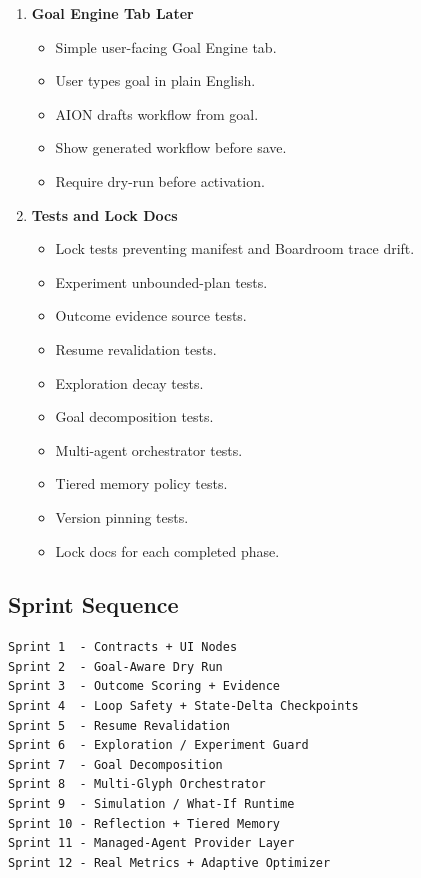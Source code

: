 \begin{enumerate}
  \item \textbf{Goal Engine Tab Later}
  \begin{itemize}
    \item Simple user-facing Goal Engine tab.
    \item User types goal in plain English.
    \item AION drafts workflow from goal.
    \item Show generated workflow before save.
    \item Require dry-run before activation.
  \end{itemize}

  \item \textbf{Tests and Lock Docs}
  \begin{itemize}
    \item Lock tests preventing manifest and Boardroom trace drift.
    \item Experiment unbounded-plan tests.
    \item Outcome evidence source tests.
    \item Resume revalidation tests.
    \item Exploration decay tests.
    \item Goal decomposition tests.
    \item Multi-agent orchestrator tests.
    \item Tiered memory policy tests.
    \item Version pinning tests.
    \item Lock docs for each completed phase.
  \end{itemize}
\end{enumerate}

\subsection{Sprint Sequence}

\begin{verbatim}
Sprint 1  - Contracts + UI Nodes
Sprint 2  - Goal-Aware Dry Run
Sprint 3  - Outcome Scoring + Evidence
Sprint 4  - Loop Safety + State-Delta Checkpoints
Sprint 5  - Resume Revalidation
Sprint 6  - Exploration / Experiment Guard
Sprint 7  - Goal Decomposition
Sprint 8  - Multi-Glyph Orchestrator
Sprint 9  - Simulation / What-If Runtime
Sprint 10 - Reflection + Tiered Memory
Sprint 11 - Managed-Agent Provider Layer
Sprint 12 - Real Metrics + Adaptive Optimizer
\end{verbatim}

